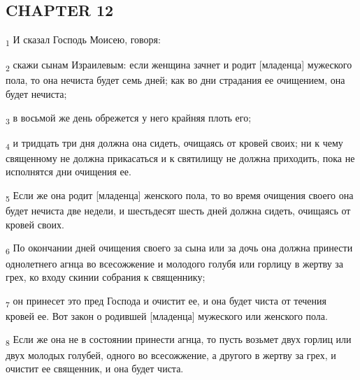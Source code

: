 \subsection{CHAPTER 12}
\begin{tcolorbox}
\textsubscript{1} И сказал Господь Моисею, говоря:
\end{tcolorbox}
\begin{tcolorbox}
\textsubscript{2} скажи сынам Израилевым: если женщина зачнет и родит [младенца] мужеского пола, то она нечиста будет семь дней; как во дни страдания ее очищением, она будет нечиста;
\end{tcolorbox}
\begin{tcolorbox}
\textsubscript{3} в восьмой же день обрежется у него крайняя плоть его;
\end{tcolorbox}
\begin{tcolorbox}
\textsubscript{4} и тридцать три дня должна она сидеть, очищаясь от кровей своих; ни к чему священному не должна прикасаться и к святилищу не должна приходить, пока не исполнятся дни очищения ее.
\end{tcolorbox}
\begin{tcolorbox}
\textsubscript{5} Если же она родит [младенца] женского пола, то во время очищения своего она будет нечиста две недели, и шестьдесят шесть дней должна сидеть, очищаясь от кровей своих.
\end{tcolorbox}
\begin{tcolorbox}
\textsubscript{6} По окончании дней очищения своего за сына или за дочь она должна принести однолетнего агнца во всесожжение и молодого голубя или горлицу в жертву за грех, ко входу скинии собрания к священнику;
\end{tcolorbox}
\begin{tcolorbox}
\textsubscript{7} он принесет это пред Господа и очистит ее, и она будет чиста от течения кровей ее. Вот закон о родившей [младенца] мужеского или женского пола.
\end{tcolorbox}
\begin{tcolorbox}
\textsubscript{8} Если же она не в состоянии принести агнца, то пусть возьмет двух горлиц или двух молодых голубей, одного во всесожжение, а другого в жертву за грех, и очистит ее священник, и она будет чиста.
\end{tcolorbox}
